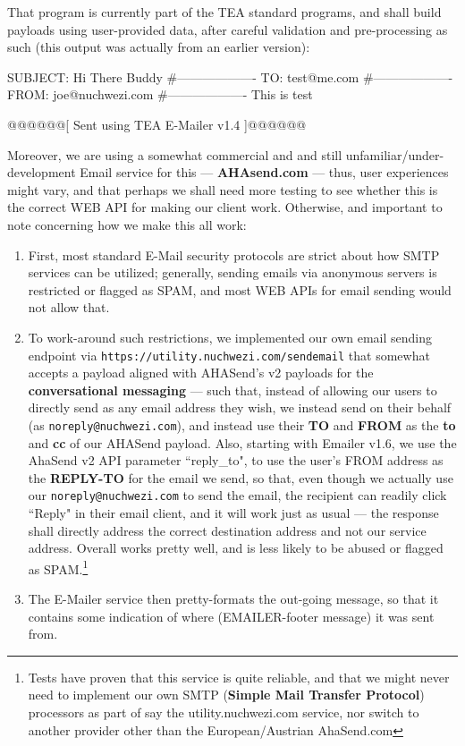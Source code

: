 \documentclass[a4paper, 18pt]{book} %
\begin{document}
{{{That program is currently part of the TEA standard programs, and shall build payloads using user-provided data, after careful validation and pre-processing as such (this output was actually from an earlier version):


\vspace{2em}
 \begin{tcbverbatim}[title=Sample OUTPUT from EMAILER v1.4]
SUBJECT: Hi There Buddy
#-------------------
TO: test@me.com
#-------------------
FROM: joe@nuchwezi.com
#-------------------
This is test

@@@@@@[ Sent using TEA E-Mailer v1.4 ]@@@@@@
  \end{tcbverbatim}
\vspace{2em}

Moreover, we are using a somewhat commercial and and still unfamiliar/under-development Email service for this --- \textbf{AHAsend.com} --- thus, user experiences might vary, and that perhaps we shall need more testing to see whether this is the correct WEB API for making our client work. Otherwise, and important to note concerning how we make this all work:

\begin{enumerate}
\item First, most standard E-Mail security protocols are strict about how SMTP services can be utilized; generally, sending emails via anonymous servers is restricted or flagged as SPAM, and most WEB APIs for email sending would not allow that.
\item To work-around such restrictions, we implemented our own email sending endpoint via \texttt{https://utility.nuchwezi.com/sendemail} that somewhat accepts a payload aligned with AHASend's v2 payloads for the \textbf{conversational messaging} --- such that, instead of allowing our users to directly send as any email address they wish, we instead send on their behalf (as \texttt{noreply@nuchwezi.com}), and instead use their \textbf{TO} and \textbf{FROM} as the \textbf{to} and \textbf{cc} of our AHASend payload. Also, starting with Emailer v1.6, we use the AhaSend v2 API parameter ``reply\_to", to use the user's FROM address as the \textbf{REPLY-TO} for the email we send, so that, even though we actually use our \texttt{noreply@nuchwezi.com} to send the email, the recipient can readily click ``Reply" in their email client, and it will work just as usual --- the response shall directly address the correct destination address and not our service address. Overall works pretty well, and is less likely to be abused or flagged as SPAM.\footnote{Tests have proven that this service is quite reliable, and that we might never need to implement our own SMTP (\textbf{Simple Mail Transfer Protocol}) processors as part of say the utility.nuchwezi.com service, nor switch to another provider other than the European/Austrian AhaSend.com}
\item The E-Mailer service then pretty-formats the out-going message, so that it contains some indication of where (EMAILER-footer message) it was sent from.
\end{enumerate}

}}}
\end{document}
